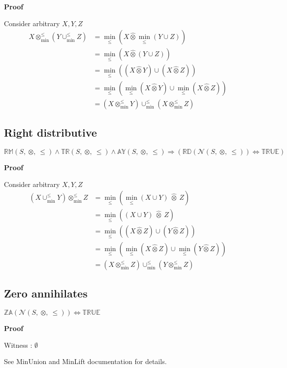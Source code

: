 \documentclass[10pt]{article}
\newcommand{\propname}[1]{{\mathbb{#1}}}
\newcommand{\minlift}{\otimes_{\min}^{\leq}}
\newcommand{\lift}{\hat{\otimes}}
\newcommand{\minunion}{\cup_{\min}^{\leq}}
\newcommand{\proof}{\vspace{1em} \textbf{Proof} \vspace{1em}}
\begin{document}
\proof

Consider arbitrary $X,Y,Z$
\begin{align*}
X \minlift (Y \minunion Z) 	& = \min_\leq(X \lift \min_\leq(Y \cup Z)) \\
							& = \min_\leq(X \lift (Y \cup Z)) \\
							& = \min_\leq((X \lift Y) \cup (X \lift Z)) \\
							& = \min_\leq(\min_\leq(X \lift Y) \cup \min_\leq(X \lift Z)) \\
							& = (X \minlift Y) \minunion (X \minlift Z)
\end{align*}



\subsection{Right distributive}

$\propname{RM}(S,\ \otimes,\ \leq) \wedge \propname{TR}(S,\ \otimes,\ \leq) \wedge \propname{AY}(S,\ \otimes, \ \leq) \Rightarrow (\propname{RD}(\mathcal{N}(S,\ \otimes,\ \leq))  \Leftrightarrow \propname{TRUE})$

\proof

Consider arbitrary $X,Y,Z$
\begin{align*}
(X \minunion Y) \minlift Z 	& = \min_\leq(\min_\leq(X \cup Y) \ \lift \ Z) \\
							& = \min_\leq((X \cup Y) \ \lift \ Z) \\
							& = \min_\leq((X \lift Z) \cup (Y \lift Z)) \\
							& = \min_\leq(\min_\leq(X \lift Z) \cup \min_\leq(Y \lift Z)) \\
							& = (X \minlift Z) \minunion (Y \minlift Z)
\end{align*}



\subsection{Zero annihilates}

$\propname{ZA}(\mathcal{N}(S,\ \otimes,\ \leq)) \Leftrightarrow \propname{TRUE}$

\proof

Witness : $\emptyset$

\vspace{0.5em}

See MinUnion and MinLift documentation for details.
\end{document}
